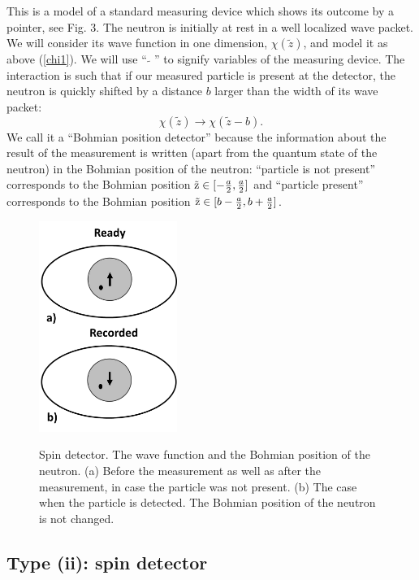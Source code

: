 \documentclass[preprint,tightenlines]{elsarticle}
\begin{document}
 This is a model of a standard
measuring device which shows its outcome by a pointer, see Fig. 3. The neutron
is initially at rest in a well localized wave packet. We will consider  its wave function in one dimension, $\chi(\tilde{z})$, and model it  as above (\ref{chi1}). We will use ``$~\tilde{~}~$'' to
signify variables of the measuring device. The interaction is such
that if our measured particle is present at the detector, the neutron
is quickly shifted by a distance $b$ larger than the width of its
wave packet:
\begin{equation}
\chi(\tilde{z})\rightarrow \chi(\tilde{z}-b).\label{psiout2}
\end{equation}
 We call it a ``Bohmian position detector'' because the information
about the result of the measurement is written (apart from the quantum
state of the neutron) in the Bohmian position of the neutron: ``particle
is not present'' corresponds to the Bohmian position ${\rm \tilde{z}}\in[-\frac{a}{2},\frac{a}{2}]$
and ``particle present'' corresponds to the Bohmian position ${\rm \tilde{z}}\in[b-\frac{a}{2},b+\frac{a}{2}]$.



\begin{figure}[h]
  \includegraphics[width=4.5cm]{4.pdf}\\ \vspace{-6pt}
    \caption{ Spin detector.  The wave function and the Bohmian position of the neutron. (a)  Before the measurement as well as after the measurement, in case the particle was not present. (b) The case when the particle is detected.  The Bohmian position of the neutron is not changed.}
\end{figure}

\subsection{  Type {\rm (ii)}: spin detector}
\end{document}
